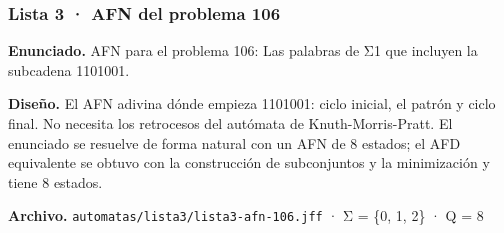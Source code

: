 
\hypertarget{lista-3-afn-del-problema-106}{%
\subsubsection{Lista 3 · AFN del problema 106}\label{lista-3-afn-del-problema-106}}

\textbf{Enunciado.} AFN para el problema 106: Las palabras de Σ1 que incluyen la subcadena 1101001.

\textbf{Diseño.} El AFN adivina dónde empieza 1101001: ciclo inicial, el patrón y ciclo final. No necesita los retrocesos del autómata de Knuth-Morris-Pratt. El enunciado se resuelve de forma natural con un AFN de 8 estados; el AFD equivalente se obtuvo con la construcción de subconjuntos y la minimización y tiene 8 estados.

\textbf{Archivo.} \texttt{automatas/lista3/lista3-afn-106.jff} · Σ = \{0, 1, 2\} · \textbar Q\textbar{} = 8

